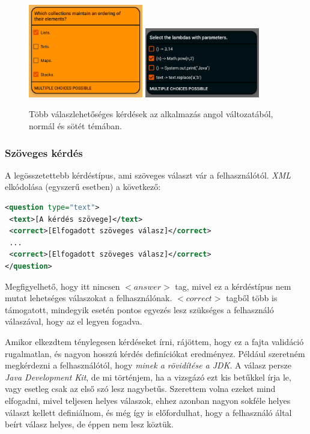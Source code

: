 \documentclass[12pt,a4paper]{article}
\newcommand{\xml}{\textit{XML}\xspace}
\begin{document}
 	\begin{figure}[h!]
 		\centering
 		\includegraphics[width=5cm]{question_multi_choice}
 		\includegraphics[width=5cm]{question_multi_choice_dark}
 		\caption{Több válaszlehetőséges kérdések az alkalmazás angol változatából, normál és sötét témában.}
 		\label{question_multi_choice_figure}
	 \end{figure}
	
	\subsubsection{Szöveges kérdés}\label{question_text}
	
	A legösszetettebb kérdéstípus, ami szöveges választ vár a felhasználótól. \xml elkódolása (egyszerű esetben) a következő:
	
	\bigskip
	\begin{lstlisting}[language=XML]
<question type="text">
 <text>[A kérdés szövege]</text>
 <correct>[Elfogadott szöveges válasz]</correct>
 ...
 <correct>[Elfogadott szöveges válasz]</correct>
</question>
	\end{lstlisting}
	\bigskip
	
	\noindent
	Megfigyelhető, hogy itt nincsen $<answer>$ tag, mivel ez a kérdéstípus nem mutat lehetséges válaszokat a felhasználónak. $<correct>$ tagből több is támogatott, mindegyik esetén pontos egyezés lesz szükséges a felhasználó válaszával, hogy az el legyen fogadva.
	
	Amikor elkezdtem ténylegesen kérdéseket írni, rájöttem, hogy ez a fajta validáció rugalmatlan, és nagyon hosszú kérdés definíciókat eredményez. Például szeretném megkérdezni a felhasználótól, hogy \textit{minek a rövidítése a JDK}. A válasz persze \textit{Java Development Kit}, de mi történjem, ha a vizsgázó ezt kis betűkkel írja le, vagy esetleg csak az első szó lesz nagybetűs. Szerettem volna ezeket mind elfogadni, mivel teljesen helyes válaszok, ehhez azonban nagyon sokféle helyes választ kellett definiálnom, és még így is előfordulhat, hogy a felhasználó által beírt válasz helyes, de éppen nem lesz köztük.
	
\end{document}
